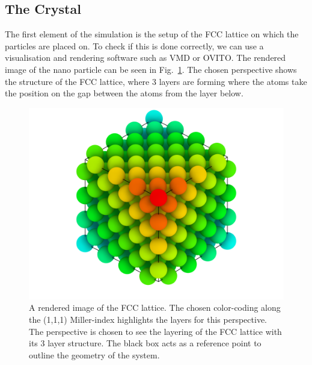 \documentclass[12pt]{article}
\begin{document}
\subsection{The Crystal}
The first element of the simulation is the setup of the FCC lattice on which the particles are placed on. To check if this is done correctly, we can
use a visualisation and rendering software such as VMD\cite{Humphrey1996} or OVITO\cite{Stukowski2010}. The rendered image of the nano particle 
can be seen in Fig.~\ref{fig:glass}. The chosen perspective shows the structure of the FCC lattice, where 3 layers are forming 
where the atoms take the position on the gap between the atoms from the layer below.\\
\begin{figure}[h]
    \begin{center}
        \includegraphics[scale=0.2]{images/fcc_rendering_layer_newcoloring.png}
        \caption{A rendered image of the FCC lattice. The chosen color-coding along the (1,1,1) Miller-index 
                highlights the layers for this perspective. The perspective is
                chosen to see the layering of the FCC lattice with its 3 layer structure. The black box acts as a reference point to outline the 
                geometry of the system.}
        \label{fig:glass}
    \end{center}
\end{figure}
\end{document}
